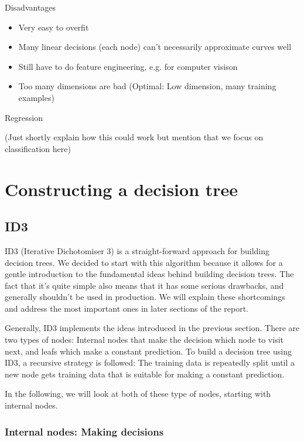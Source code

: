 \documentclass[a4paper]{article}
\begin{document}
Disadvantages

\begin{itemize}
	\item Very easy to overfit
    \item Many linear decisions (each node) can't necessarily approximate curves well
    \item Still have to do feature engineering, e.g. for computer visison
    \item Too many dimensions are bad (Optimal: Low dimension, many training examples)
\end{itemize}

Regression

(Just shortly explain how this could work but mention that we focus on classification here)

\section{Constructing a decision tree}

\subsection{ID3}

ID3 (Iterative Dichotomiser 3) is a straight-forward approach for building decision trees. We decided to start with this algorithm because it allows for a gentle introduction to the fundamental ideas behind building decision trees.
The fact that it's quite simple also means that it has some serious drawbacks, and generally shouldn't be used in production. We will explain these shortcomings and address the most important ones in later sections of the report.

Generally, ID3 implements the ideas introduced in the previous section. There are two types of nodes: Internal nodes that make the decision which node to visit next, and leafs  which make a constant prediction.
To build a decision tree using ID3, a recursive strategy is followed: The training data is repeatedly split until a new node gets training data that is suitable for making a constant prediction.

In the following, we will look at both of these type of nodes, starting with internal nodes.

\subsubsection{Internal nodes: Making decisions}
\end{document}
